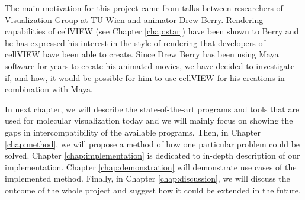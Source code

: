 \documentclass[
  digital, %
  table,   %
  nolof,     %
  nolot,     %
  oneside,
]{fithesis3}
\begin{document}


The main motivation for this project came from talks between researchers of Visualization Group at TU Wien and animator Drew Berry. Rendering capabilities of cellVIEW (see Chapter \ref{chap:star}) have been shown to Berry and he has expressed his interest in the style of rendering that developers of cellVIEW have been able to create. Since Drew Berry has been using Maya software for years to create his animated movies, we have decided to investigate if, and how, it would be possible for him to use cellVIEW for his creations in combination with Maya.

In next chapter, we will describe the state-of-the-art programs and tools that are used for molecular visualization today and we will mainly focus on showing the gaps in intercompatibility of the available programs. Then, in Chapter \ref{chap:method}, we will propose a method of how one particular problem could be solved. Chapter \ref{chap:implementation} is dedicated to in-depth description of our implementation. Chapter \ref{chap:demonstration} will demonstrate use cases of the implemented method. Finally, in Chapter \ref{chap:discussion}, we will discuss the outcome of the whole project and suggest how it could be extended in the future.
\end{document}
